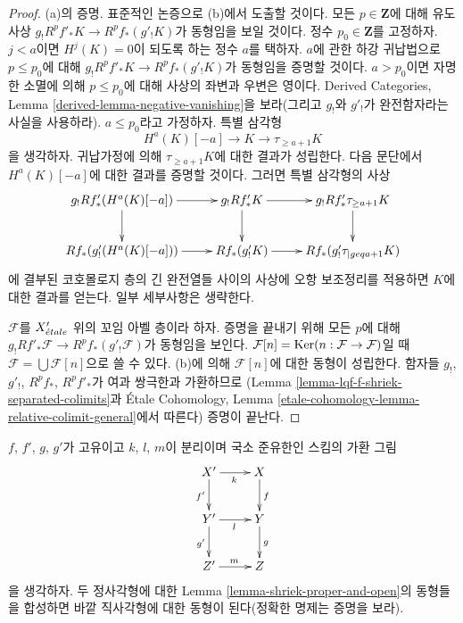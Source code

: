 \begin{proof}
\medskip\noindent
(a)의 증명. 표준적인 논증으로 (b)에서 도출할 것이다. 모든
$p \in \mathbf{Z}$에 대해 유도 사상
$g_! R^pf'_* K \to R^pf_*(g'_!K)$가 동형임을 보일 것이다.
정수 $p_0 \in \mathbf{Z}$를 고정하자. $j < a$이면 $H^j(K) = 0$이
되도록 하는 정수 $a$를 택하자. $a$에 관한 하강 귀납법으로
$p \leq p_0$에 대해 $g_! R^pf'_* K \to R^pf_*(g'_!K)$가 동형임을
증명할 것이다. $a > p_0$이면 자명한 소멸에 의해 $p \leq p_0$에
대해 사상의 좌변과 우변은 영이다. Derived Categories, Lemma
\ref{derived-lemma-negative-vanishing}을 보라(그리고 $g_!$와 $g'_!$가
완전함자라는 사실을 사용하라). $a \leq p_0$라고 가정하자.
특별 삼각형
$$
H^a(K)[-a] \to K \to \tau_{\geq a + 1}K
$$
을 생각하자. 귀납가정에 의해 $\tau_{\geq a + 1}K$에 대한 결과가
성립한다. 다음 문단에서 $H^a(K)[-a]$에 대한 결과를 증명할 것이다.
그러면 특별 삼각형의 사상
$$
\xymatrix{
g_! Rf'_*(H^a(K)[-a]) \ar[d] \ar[r] &
g_! Rf'_* K \ar[r] \ar[d] &
g_! Rf'_* \tau_{\geq a + 1} K \ar[d] \\
Rf_*(g'_!(H^a(K)[-a])) \ar[r] &
Rf_*(g'_!K) \ar[r] &
Rf_*(g'_!\tau_{|geq a + 1}K)
}
$$
에 결부된 코호몰로지 층의 긴 완전열들 사이의 사상에 오항 보조정리를
적용하면 $K$에 대한 결과를 얻는다. 일부 세부사항은 생략한다.

\medskip\noindent
$\mathcal{F}$를 $X'_{\acute{e}tale}$ 위의 꼬임 아벨 층이라 하자. 증명을
끝내기 위해 모든 $p$에 대해
$g_! Rf'_*\mathcal{F} \to R^pf_*(g'_!\mathcal{F})$가 동형임을 보인다.
$\mathcal{F}[n] = \mathop{\mathrm{Ker}}(n : \mathcal{F} \to \mathcal{F})$일 때
$\mathcal{F} = \bigcup \mathcal{F}[n]$으로 쓸 수 있다.
(b)에 의해 $\mathcal{F}[n]$에 대한 동형이 성립한다. 함자들
$g_!$, $g'_!$, $R^pf_*$, $R^pf'_*$가 여과 쌍극한과 가환하므로
(Lemma \ref{lemma-lqf-f-shriek-separated-colimits}과
\'Etale Cohomology, Lemma
\ref{etale-cohomology-lemma-relative-colimit-general}에서 따른다)
증명이 끝난다.
\end{proof}

\begin{lemma}
\label{lemma-shriek-proper-and-open-compose}
$f$, $f'$, $g$, $g'$가 고유이고 $k$, $l$, $m$이 분리이며 국소
준유한인 스킴의 가환 그림
$$
\xymatrix{
X' \ar[r]_k \ar[d]_{f'} & X \ar[d]^f \\
Y' \ar[r]_l \ar[d]_{g'} & Y \ar[d]^g \\
Z' \ar[r]^m & Z
}
$$
을 생각하자. 두 정사각형에 대한 Lemma
\ref{lemma-shriek-proper-and-open}의 동형들을 합성하면 바깥
직사각형에 대한 동형이 된다(정확한 명제는 증명을 보라).
\end{lemma}

